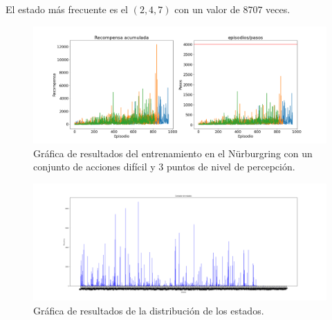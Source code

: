 El estado más frecuente es el  $(2,4,7)$ con un valor de $8707$ veces.

\begin{figure}[!ht]
    \centering \includegraphics[width=1\columnwidth]{./figures/anexos/nurburgring_hard_3.png}
    \caption{Gráfica de resultados del entrenamiento en el Nürburgring con un conjunto de acciones difícil y 3 puntos de nivel de percepción.}
\end{figure}

\begin{figure}[!ht]
    \centering \includegraphics[width=1\columnwidth]{./figures/anexos/states_counter_nurburgring_hard_3.png}
    \caption{Gráfica de resultados de la distribución de los estados.}
\end{figure}

